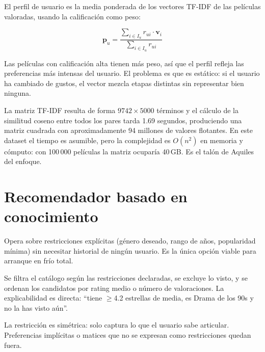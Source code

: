 El perfil de usuario es la media ponderada de los vectores TF-IDF de las películas valoradas, usando la calificación como peso:

\begin{equation}
    \mathbf{p}_u = \frac{\displaystyle\sum_{i \in I_u} r_{ui} \cdot \mathbf{v}_i}
                        {\displaystyle\sum_{i \in I_u} r_{ui}}
\end{equation}

Las películas con calificación alta tienen más peso, así que el perfil refleja las preferencias más intensas del usuario. El problema es que es estático: si el usuario ha cambiado de gustos, el vector mezcla etapas distintas sin representar bien ninguna.

La matriz TF-IDF resulta de forma $9742 \times 5000$ términos y el cálculo de la similitud coseno entre todos los pares tarda 1.69 segundos, produciendo una matriz cuadrada con aproximadamente 94 millones de valores flotantes. En este dataset el tiempo es asumible, pero la complejidad es $O(n^2)$ en memoria y cómputo: con 100\,000 películas la matriz ocuparía 40\,GB. Es el talón de Aquiles del enfoque.

\section{Recomendador basado en conocimiento}

Opera sobre restricciones explícitas (género deseado, rango de años, popularidad mínima) sin necesitar historial de ningún usuario. Es la única opción viable para arranque en frío total.

Se filtra el catálogo según las restricciones declaradas, se excluye lo visto, y se ordenan los candidatos por rating medio o número de valoraciones. La explicabilidad es directa: ``tiene $\geq$4.2 estrellas de media, es Drama de los 90s y no la has visto aún''.

La restricción es simétrica: solo captura lo que el usuario sabe articular. Preferencias implícitas o matices que no se expresan como restricciones quedan fuera.
